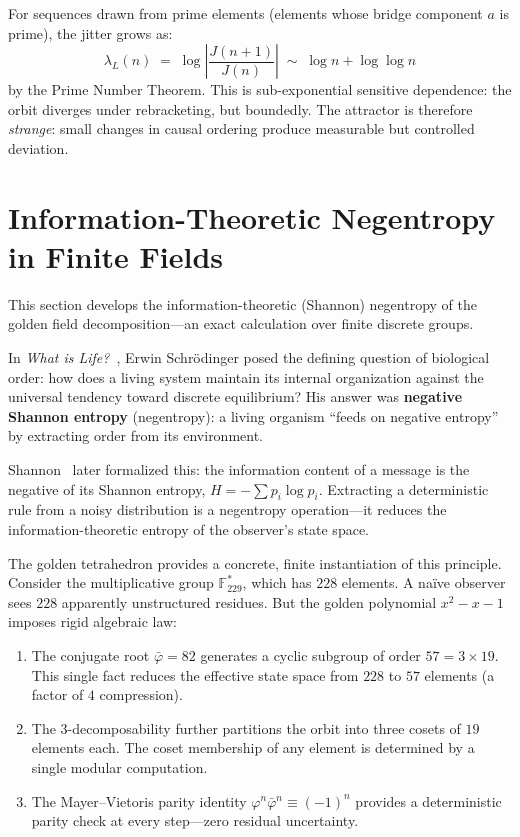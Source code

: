 For sequences drawn from prime elements (elements whose
bridge component $a$ is prime), the jitter grows as:
\[
\lambda_L(n) \;=\; \log\!\left|\frac{J(n+1)}{J(n)}\right|
\;\sim\; \log n + \log\log n
\]
by the Prime Number Theorem. This is sub-exponential sensitive
dependence: the orbit diverges under rebracketing, but
boundedly. The attractor is therefore \emph{strange}: small
changes in causal ordering produce measurable but controlled
deviation.

\section{Information-Theoretic Negentropy in Finite Fields}
\label{sec:negentropy}

This section develops the information-theoretic (Shannon) negentropy of the golden field decomposition---an exact calculation over finite discrete groups.

In \emph{What is Life?}~\cite{schrodinger44}, Erwin Schr\"odinger posed
the defining question of biological order: how does a living system
maintain its internal organization against the universal tendency
toward discrete equilibrium? His answer was \textbf{negative
Shannon entropy} (negentropy): a living organism ``feeds on negative entropy''
by extracting order from its environment.

Shannon~\cite{shannon48} later formalized this: the information content
of a message is the negative of its Shannon entropy,
$H = -\sum p_i \log p_i$. Extracting a deterministic rule from a
noisy distribution is a negentropy operation---it reduces the
information-theoretic entropy of the observer's state space.

The golden tetrahedron provides a concrete, finite instantiation
of this principle. Consider the multiplicative group
$\mathbb{F}_{229}^*$, which has $228$ elements. A na\"ive observer
sees $228$ apparently unstructured residues. But the golden
polynomial $x^2 - x - 1$ imposes rigid algebraic law:

\begin{enumerate}
  \item The conjugate root $\bar\varphi = 82$ generates a cyclic
    subgroup of order $57 = 3 \times 19$. This single fact reduces
    the effective state space from $228$ to $57$ elements (a factor
    of $4$ compression).
  \item The $3$-decomposability further partitions the orbit into
    three cosets of $19$ elements each. The coset membership of
    any element is determined by a single modular computation.
  \item The Mayer--Vietoris parity identity
    $\varphi^n \bar\varphi^n \equiv (-1)^n$ provides a deterministic
    parity check at every step---zero residual uncertainty.
\end{enumerate}

